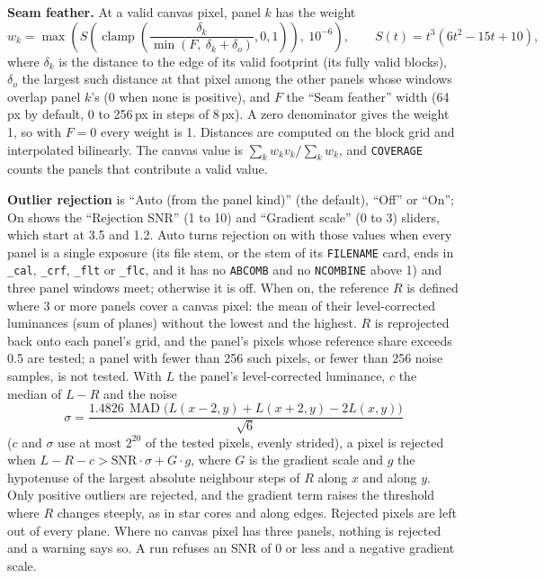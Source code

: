 \documentclass[11pt,a4paper]{article}
\newcommand{\code}[1]{\texttt{\small #1}}
\begin{document}
    \textbf{Seam feather.} At a valid canvas pixel, panel $k$ has the weight
    \begin{equation}
        w_k = \max\!\left(S\!\left(\operatorname{clamp}\!\left(\frac{\delta_k}{\min(F,\ \delta_k + \delta_o)}, 0, 1\right)\right),\ 10^{-6}\right), \qquad S(t) = t^3 (6t^2 - 15t + 10),
    \end{equation}
    where $\delta_k$ is the distance to the edge of its valid footprint (its fully valid blocks), $\delta_o$ the largest such distance at that pixel among the other panels whose windows overlap panel $k$'s (0 when none is positive), and $F$ the ``Seam feather'' width (64\,px by default, 0 to 256\,px in steps of 8\,px). A zero denominator gives the weight 1, so with $F = 0$ every weight is 1. Distances are computed on the block grid and interpolated bilinearly. The canvas value is $\sum_k w_k v_k / \sum_k w_k$, and \code{COVERAGE} counts the panels that contribute a valid value.

    \textbf{Outlier rejection} is ``Auto (from the panel kind)'' (the default), ``Off'' or ``On''; On shows the ``Rejection SNR'' (1 to 10) and ``Gradient scale'' (0 to 3) sliders, which start at 3.5 and 1.2. Auto turns rejection on with those values when every panel is a single exposure (its file stem, or the stem of its \code{FILENAME} card, ends in \code{\_cal}, \code{\_crf}, \code{\_flt} or \code{\_flc}, and it has no \code{ABCOMB} and no \code{NCOMBINE} above 1) and three panel windows meet; otherwise it is off. When on, the reference $R$ is defined where 3 or more panels cover a canvas pixel: the mean of their level-corrected luminances (sum of planes) without the lowest and the highest. $R$ is reprojected back onto each panel's grid, and the panel's pixels whose reference share exceeds 0.5 are tested; a panel with fewer than 256 such pixels, or fewer than 256 noise samples, is not tested. With $L$ the panel's level-corrected luminance, $c$ the median of $L - R$ and the noise
    \begin{equation}
        \sigma = \frac{1.4826\,\operatorname{MAD}\big(L(x-2, y) + L(x+2, y) - 2L(x, y)\big)}{\sqrt{6}}
    \end{equation}
    ($c$ and $\sigma$ use at most $2^{20}$ of the tested pixels, evenly strided), a pixel is rejected when $L - R - c > \text{SNR}\cdot\sigma + G\cdot g$, where $G$ is the gradient scale and $g$ the hypotenuse of the largest absolute neighbour steps of $R$ along $x$ and along $y$. Only positive outliers are rejected, and the gradient term raises the threshold where $R$ changes steeply, as in star cores and along edges. Rejected pixels are left out of every plane. Where no canvas pixel has three panels, nothing is rejected and a warning says so. A run refuses an SNR of 0 or less and a negative gradient scale.
\end{document}
